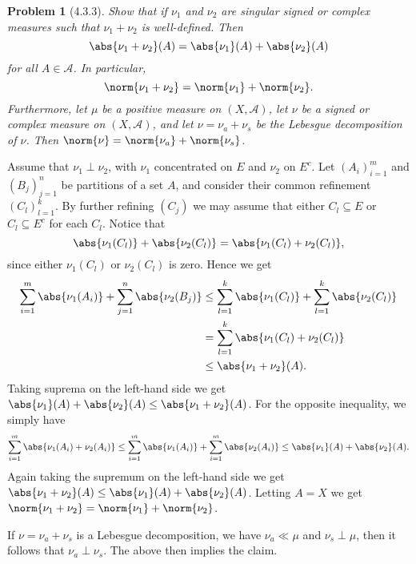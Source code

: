 \documentclass[a4paper, 11pt]{memoir}
\theoremstyle{plaincustomnumber}
\newtheorem{problem}{Problem}
\theoremstyle{changedotbreakcustomnumber}
\newcommand{\calA}{\mathcal{A}}
\begin{document}
\begin{problem}[4.3.3]
    Show that if $\nu_1$ and $\nu_2$ are singular signed or complex measures such that $\nu_1 + \nu_2$ is well-defined. Then
    \begin{equation*}
        \abs{\nu_1 + \nu_2}(A)
            = \abs{\nu_1}(A) + \abs{\nu_2}(A)
    \end{equation*}
    for all $A \in \calA$. In particular,
    \begin{equation*}
        \norm{\nu_1 + \nu_2}
            = \norm{\nu_1} + \norm{\nu_2}.
    \end{equation*}
    Furthermore, let $\mu$ be a positive measure on $(X,\calA)$, let $\nu$ be a signed or complex measure on $(X,\calA)$, and let $\nu = \nu_a + \nu_s$ be the Lebesgue decomposition of $\nu$. Then $\norm{\nu} = \norm{\nu_a} + \norm{\nu_s}$.
\end{problem}

\begin{solution}
    Assume that $\nu_1 \perp \nu_2$, with $\nu_1$ concentrated on $E$ and $\nu_2$ on $E^c$. Let $(A_i)_{i=1}^m$ and $(B_j)_{j=1}^n$ be partitions of a set $A$, and consider their common refinement $(C_l)_{l=1}^k$. By further refining $(C_j)$ we may assume that either $C_l \subseteq E$ or $C_l \subseteq E^c$ for each $C_l$. Notice that
    \begin{equation*}
        \abs{\nu_1(C_l)} + \abs{\nu_2(C_l)}
            = \abs{\nu_1(C_l) + \nu_2(C_l)},
    \end{equation*}
    since either $\nu_1(C_l)$ or $\nu_2(C_l)$ is zero. Hence we get
    \begin{align*}
        \sum_{i=1}^m \abs{\nu_1(A_i)} + \sum_{j=1}^n \abs{\nu_2(B_j)}
            &\leq \sum_{l=1}^k \abs{\nu_1(C_l)} + \sum_{l=1}^k \abs{\nu_2(C_l)} \\
            &= \sum_{l=1}^k \abs{\nu_1(C_l) + \nu_2(C_l)} \\
            &\leq \abs{\nu_1 + \nu_2}(A).
    \end{align*}
    Taking suprema on the left-hand side we get $\abs{\nu_1}(A) + \abs{\nu_2}(A) \leq \abs{\nu_1 + \nu_2}(A)$. For the opposite inequality, we simply have
    \begin{equation*}
        \sum_{i=1}^m \abs{\nu_1(A_i) + \nu_2(A_i)}
            \leq \sum_{i=1}^m \abs{\nu_1(A_i)} + \sum_{i=1}^m \abs{\nu_2(A_i)}
            \leq \abs{\nu_1}(A) + \abs{\nu_2}(A).
    \end{equation*}
    Again taking the supremum on the left-hand side we get $\abs{\nu_1 + \nu_2}(A) \leq \abs{\nu_1}(A) + \abs{\nu_2}(A)$. Letting $A = X$ we get $\norm{\nu_1 + \nu_2} = \norm{\nu_1} + \norm{\nu_2}$.

    If $\nu = \nu_a + \nu_s$ is a Lebesgue decomposition, we have $\nu_a \ll \mu$ and $\nu_s \perp \mu$, then it follows that $\nu_a \perp \nu_s$. The above then implies the claim.
\end{solution}
\end{document}
